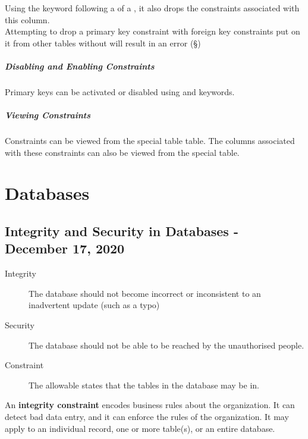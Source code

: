 \documentclass[11pt,a4paper,twocolumn]{book}
\begin{document}
Using the  keyword following a  of a , it also drops the  constraints associated with this column.\\

Attempting to drop a primary key constraint with foreign key constraints put on it from other tables without  will result in an error (\S {})\\

\subsubsection{Disabling and Enabling Constraints}

Primary keys can be activated or disabled using  and  keywords.

\subsubsection{Viewing Constraints}

Constraints can be viewed from the special table  table. The columns associated with these constraints can also be viewed from the  special table.

\part{Databases}

\chapter{Integrity and Security in Databases - December 17, 2020}

\begin{description}
\item[Integrity] The database should not become incorrect or inconsistent to an inadvertent update (such as a typo)
\item[Security] The database should not be able to be reached by the unauthorised people.
\item[Constraint] The allowable states that the tables in the database may be in.
\end{description}

An \textbf{integrity constraint} encodes business rules about the organization. It can detect bad data entry, and it can enforce the rules of the organization. It may apply to an individual record, one or more table(s), or an entire database.\\
 
\end{document}

